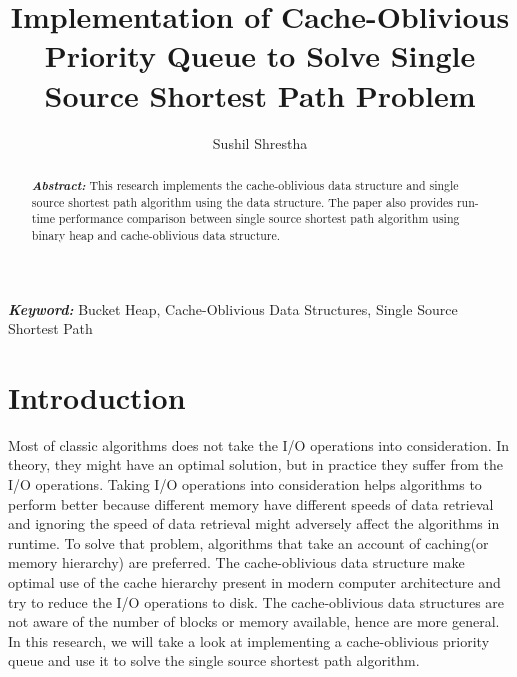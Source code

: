 \documentclass[final,3p]{CSP}
\begin{document}
    \begin{frontmatter}

        \title{Implementation of Cache-Oblivious Priority Queue to Solve Single Source Shortest Path Problem}

        \author[mymainaddress]{Sushil Shrestha}

        \address[mymainaddress]{sushilsh@hawaii.edu}

        \begin{keyword}\rm
        \begin{adjustwidth}{2cm}{2cm}{\itshape\textbf{Keyword:}}
            Bucket Heap, Cache-Oblivious Data Structures, Single Source Shortest Path
        \end{adjustwidth}
        \end{keyword}

        \begin{abstract}\rm
        \begin{adjustwidth}{2cm}{2cm}{\itshape\textbf{Abstract:}}
            This research implements the cache-oblivious data structure and single source shortest path algorithm  using the data structure. The paper also provides run-time performance comparison between single source shortest path algorithm using binary heap and cache-oblivious data structure.
        \end{adjustwidth}
        \end{abstract}
    \end{frontmatter}

    \section{Introduction}
    \label{}
    \noindent
    Most of classic algorithms does not take the I/O operations into consideration. In theory, they might have an optimal solution, but in practice they suffer from the I/O operations. Taking I/O operations into consideration helps algorithms to perform better because different memory have different speeds of data retrieval and ignoring the speed of data retrieval might adversely affect the algorithms in runtime. To solve that problem, algorithms that take an account of caching(or memory hierarchy) are preferred. The cache-oblivious data structure make optimal use of the cache hierarchy present in modern computer architecture and try to reduce the I/O operations to disk. The cache-oblivious data structures are not aware of the number of blocks or memory available, hence are more general. In this research, we will take a look at implementing a cache-oblivious priority queue and use it to solve the single source shortest path algorithm.
\end{document}
